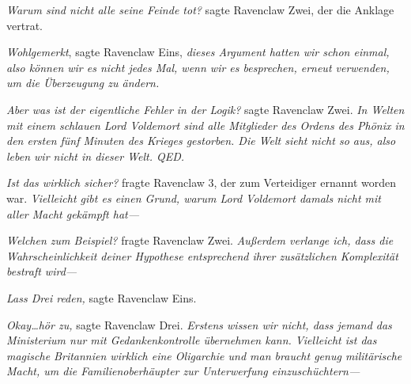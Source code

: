 \emph{Warum sind nicht alle seine Feinde tot?} sagte Ravenclaw Zwei, der die Anklage vertrat.

\emph{Wohlgemerkt}, sagte Ravenclaw Eins, \emph{dieses Argument hatten wir schon einmal, also können wir es nicht jedes Mal, wenn wir es besprechen, erneut verwenden, um die Überzeugung zu ändern.}

\emph{Aber was ist der eigentliche Fehler in der Logik?} sagte Ravenclaw Zwei. \emph{In Welten mit einem schlauen Lord Voldemort sind alle Mitglieder des Ordens des Phönix in den ersten fünf Minuten des Krieges gestorben. Die Welt sieht nicht so aus, also leben wir nicht in dieser Welt. QED.}

\emph{Ist das wirklich sicher?} fragte Ravenclaw 3, der zum Verteidiger ernannt worden war. \emph{Vielleicht gibt es einen Grund, warum Lord Voldemort damals nicht mit aller Macht gekämpft hat—}

\emph{Welchen zum Beispiel?} fragte Ravenclaw Zwei. \emph{Außerdem verlange ich, dass die Wahrscheinlichkeit deiner Hypothese entsprechend ihrer zusätzlichen Komplexität bestraft wird—}

\emph{Lass Drei reden,} sagte Ravenclaw Eins.

\emph{Okay…hör zu,} sagte Ravenclaw Drei. \emph{Erstens wissen wir nicht, dass jemand das Ministerium nur mit Gedankenkontrolle übernehmen kann. Vielleicht ist das magische Britannien wirklich eine Oligarchie und man braucht genug militärische Macht, um die Familienoberhäupter zur Unterwerfung einzuschüchtern—}

